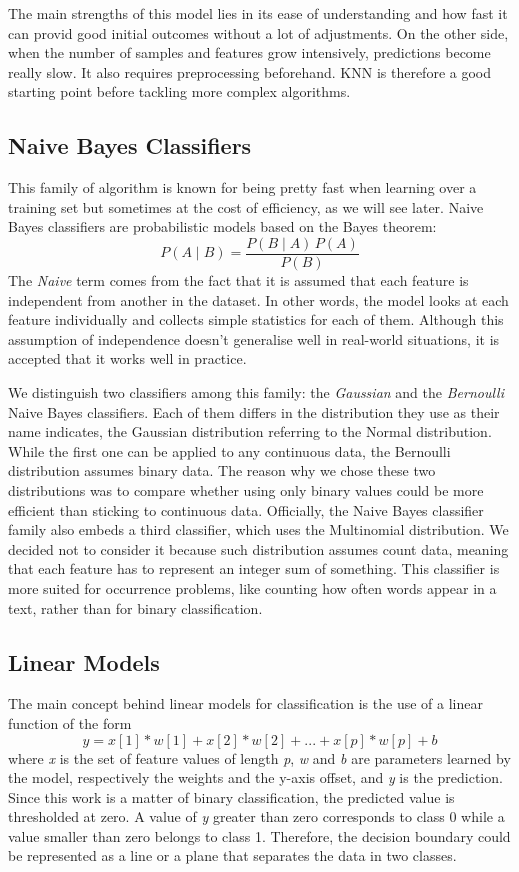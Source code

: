 The main strengths of this model lies in its ease of understanding and how fast it can provid good initial outcomes without a lot of adjustments. On the other side, when the number of samples and features grow intensively, predictions become really slow. It also requires preprocessing beforehand. KNN is therefore a good starting point before tackling more complex algorithms.

\subsection{Naive Bayes Classifiers}

This family of algorithm is known for being pretty fast when learning over a training set but sometimes at the cost of efficiency, as we will see later. Naive Bayes classifiers are probabilistic models based on the Bayes theorem:
$$ P(A \mid B) = \frac{P(B \mid A) \, P(A)}{P(B)} $$
The \textit{Naive} term comes from the fact that it is assumed that each feature is independent from another in the dataset. In other words, the model looks at each feature individually and collects simple statistics for each of them. Although this assumption of independence doesn't generalise well in real-world situations, it is accepted that it works well in practice.

We distinguish two classifiers among this family: the \textit{Gaussian} and the \textit{Bernoulli} Naive Bayes classifiers. Each of them differs in the distribution they use as their name indicates, the Gaussian distribution referring to the Normal distribution. While the first one can be applied to any continuous data, the Bernoulli distribution assumes binary data. The reason why we chose these two distributions was to compare whether using only binary values could be more efficient than sticking to continuous data. Officially, the Naive Bayes classifier family also embeds a third classifier, which uses the Multinomial distribution. We decided not to consider it because such distribution assumes count data, meaning that each feature has to represent an integer sum of something. This classifier is more suited for occurrence problems, like counting how often words appear in a text, rather than for binary classification.

\subsection{Linear Models} \label{LM}

The main concept behind linear models for classification is the use of a linear function of the form 
\[y = x[1] * w[1] + x[2] * w[2] + ... + x[p] * w[p] + b \]
where \textit{x} is the set of feature values of length \textit{p}, \textit{w} and \textit{b} are parameters learned by the model, respectively the weights and the y-axis offset, and \textit{y} is the prediction. Since this work is a matter of binary classification, the predicted value is thresholded at zero. A value of \textit{y} greater than zero corresponds to class 0 while a value smaller than zero belongs to class 1. Therefore, the decision boundary could be represented as a line or a plane that separates the data in two classes.

